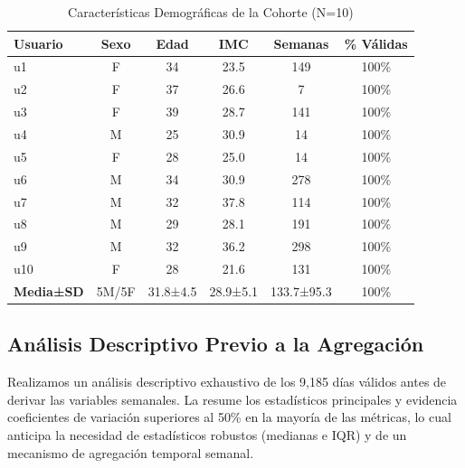 \begin{table}[htbp]
\centering
\caption{Características Demográficas de la Cohorte (N=10)}
\label{tab:cohorte_caracteristicas}
\begingroup
\setlength{\tabcolsep}{5pt}
\renewcommand{\arraystretch}{1.1}
\small
\begin{tabular}{@{}lccccc@{}}
\toprule
\textbf{Usuario} & \textbf{Sexo} & \textbf{Edad} & \textbf{IMC} & \textbf{Semanas} & \textbf{\% Válidas} \\
\midrule
u1 & F & 34 & 23.5 & 149 & 100\% \\
u2 & F & 37 & 26.6 & 7   & 100\% \\
u3 & F & 39 & 28.7 & 141 & 100\% \\
u4 & M & 25 & 30.9 & 14  & 100\% \\
u5 & F & 28 & 25.0 & 14  & 100\% \\
u6 & M & 34 & 30.9 & 278 & 100\% \\
u7 & M & 32 & 37.8 & 114 & 100\% \\
u8 & M & 29 & 28.1 & 191 & 100\% \\
u9 & M & 32 & 36.2 & 298 & 100\% \\
u10 & F & 28 & 21.6 & 131 & 100\% \\
\midrule
\textbf{Media±SD} & 5M/5F & 31.8±4.5 & 28.9±5.1 & 133.7±95.3 & 100\% \\
\bottomrule
\end{tabular}
\endgroup
\end{table}

\subsection{Análisis Descriptivo Previo a la Agregación}
\label{subsec:analisis_descriptivo}

Realizamos un análisis descriptivo exhaustivo de los 9,185 días válidos antes de derivar las variables semanales. La  resume los estadísticos principales y evidencia coeficientes de variación superiores al 50\% en la mayoría de las métricas, lo cual anticipa la necesidad de estadísticos robustos (medianas e IQR) y de un mecanismo de agregación temporal semanal.

